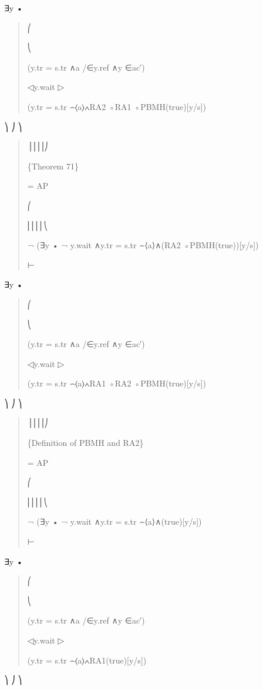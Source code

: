 \documentclass[11pt]{article}
\begin{document}
∃y •

\begin{quote}\small\raggedright
⎛
\par
⎝
\par
(y.tr = s.tr ∧a /∈y.ref ∧y ∈ac′)
\par
◁y.wait ▷
\par
(y.tr = s.tr ⌢⟨a⟩∧RA2 ◦RA1 ◦PBMH(true)[y/s])
\end{quote}

⎞ ⎠ ⎞

\begin{quote}\small\raggedright
⎟⎟⎟⎟⎠
\par
\{Theorem 71\}
\par
= AP
\par
⎛
\par
⎜⎜⎜⎜⎝
\par
¬ (∃y • ¬ y.wait ∧y.tr = s.tr ⌢⟨a⟩∧(RA2 ◦PBMH(true))[y/s])
\par
⊢
\end{quote}

∃y •

\begin{quote}\small\raggedright
⎛
\par
⎝
\par
(y.tr = s.tr ∧a /∈y.ref ∧y ∈ac′)
\par
◁y.wait ▷
\par
(y.tr = s.tr ⌢⟨a⟩∧RA1 ◦RA2 ◦PBMH(true)[y/s])
\end{quote}

⎞ ⎠ ⎞

\begin{quote}\small\raggedright
⎟⎟⎟⎟⎠
\par
\{Definition of PBMH and RA2\}
\par
= AP
\par
⎛
\par
⎜⎜⎜⎜⎝
\par
¬ (∃y • ¬ y.wait ∧y.tr = s.tr ⌢⟨a⟩∧(true)[y/s])
\par
⊢
\end{quote}

∃y •

\begin{quote}\small\raggedright
⎛
\par
⎝
\par
(y.tr = s.tr ∧a /∈y.ref ∧y ∈ac′)
\par
◁y.wait ▷
\par
(y.tr = s.tr ⌢⟨a⟩∧RA1(true)[y/s])
\end{quote}

⎞ ⎠ ⎞
\end{document}
